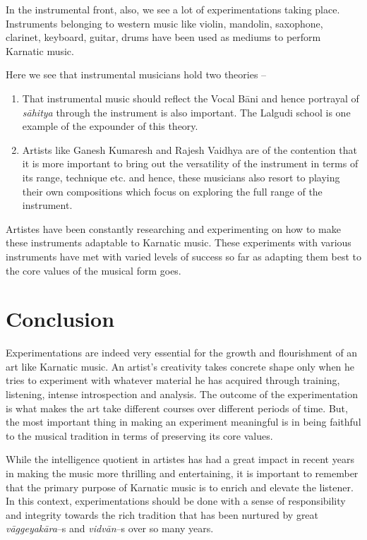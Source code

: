 In the instrumental front, also, we see a lot of experimentations taking place. Instruments belonging to western music like violin, mandolin, saxophone, clarinet, keyboard, guitar, drums have been used as mediums to perform Karnatic music.

Here we see that instrumental musicians hold two theories –

\begin{enumerate}
\item That instrumental music should reflect the Vocal Bāni and hence portrayal of \textit{sāhitya} through the instrument is also important. The Lalgudi school is one example of the expounder of this theory.

 \item Artists like Ganesh Kumaresh and Rajesh Vaidhya are of the contention that it is more important to bring out the versatility of the instrument in terms of its range, technique etc. and hence, these musicians also resort to playing their own compositions which focus on exploring the full range of the instrument.

\end{enumerate}

Artistes have been constantly researching and experimenting on how to make these instruments adaptable to Karnatic music. These experiments with various instruments have met with varied levels of success so far as adapting them best to the core values of the musical form goes.


\section*{Conclusion}

Experimentations are indeed very essential for the growth and flourishment of an art like Karnatic music. An artist’s creativity takes concrete shape only when he tries to experiment with whatever material he has acquired through training, listening, intense introspection and analysis. The outcome of the experimentation is what makes the art take different courses over different periods of time. But, the most important thing in making an experiment meaningful is in being faithful to the musical tradition in terms of preserving its core values.

While the intelligence quotient in artistes has had a great impact in recent years in making the music more thrilling and entertaining, it is important to remember that the primary purpose of Karnatic music is to enrich and elevate the listener. In this context, experimentations should be done with a sense of responsibility and integrity towards the rich tradition that has been nurtured by great \textit{vāggeyakāra}–s and \textit{vidvān}–s over so many years.

